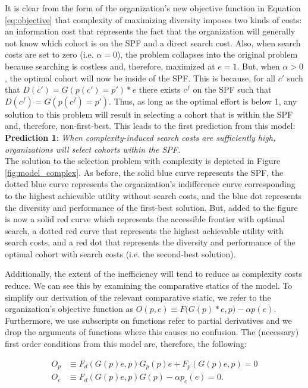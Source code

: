 It is clear from the form of the organization's new objective function in Equation \ref{eq:objective} that complexity of maximizing diversity imposes two kinds of costs: an information cost that represents the fact that the organization will generally not know which cohort is on the SPF and a direct search cost. Also, when search costs are set to zero (i.e. $\alpha=0$), the problem collapses into the original problem because searching is costless and, therefore, maximized at $e=1$. But, when $\alpha>0$, the optimal cohort will now be inside of the SPF. This is because, for all $c'$ such that  $D(c')=G(p(c')=p')*e$ there exists $c^f$ on the SPF such that $D(c^f)=G(p(c^f)=p')$. Thus, as long as the optimal effort is below 1, any solution to this problem will result in selecting a cohort that is within the SPF and, therefore, non-first-best. This leads to the first prediction from this model: \\

\noindent \textbf{Prediction 1}: \emph{When complexity-induced search costs are sufficiently high, organizations will select cohorts within the SPF.} \\

The solution to the selection problem with complexity is depicted in Figure \ref{fig:model_complex}. As before, the solid blue curve represents the SPF, the dotted blue curve represents the organization's indifference curve corresponding to the highest achievable utility without search costs, and the blue dot represents the diversity and performance of the first-best solution. But, added to the figure is now a solid red curve which represents the accessible frontier with optimal search, a dotted red curve that represents the highest achievable utility with search costs, and a red dot that represents the diversity and performance of the optimal cohort with search costs (i.e. the second-best solution). 

Additionally, the extent of the inefficiency will tend to reduce as complexity costs reduce. We can see this by examining the comparative statics of the model. To simplify our derivation of the relevant comparative static, we refer to the organization's objective function as $O(p,e)\equiv F\Big(G(p)*e ,p\Big) - \alpha p(e)$. Furthermore, we use subscripts on functions refer to partial derivatives and we drop the arguments of functions where this causes no confusion. The (necessary) first order conditions from this model are, therefore, the following:

\begin{align}
O_p & \equiv F_{d}(G(p)e,p)G_p(p)e + F_p(G(p)e,p) = 0 \nonumber \\
O_e & \equiv F_{d}(G(p)e,p)G(p) - \alpha p_e(e) = 0. \nonumber
\end{align}

